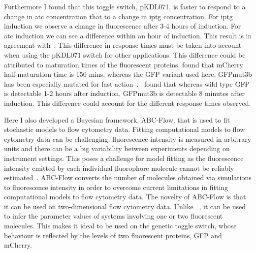 Furthermore I found that this toggle switch, pKDL071, is faster to respond to a change in \acrshort{atc} concentration that to a change in \acrshort{iptg} concentration. For \acrshort{iptg} induction we observe a change in fluorescence after 3-4 hours of induction. For \acrshort{atc} induction we can see a difference within an hour of induction. This result is in agreement with~\textcite{Litcofsky:2012gr}. This difference in response times must be taken into account when using the pKDL071 switch for other applications. This difference could be attributed to maturation times of the fluorescent proteins. \textcite{Macdonald:2012el} found that mCherry half-maturation time is 150 mins, whereas the GFP variant used here, GFPmut3b has been especially mutated for fast action~\autocite{Cormack:1996gv}.~\textcite{Cormack:1996gv} found that whereas wild type GFP is detectable 1-2 hours after induction, GFPmut3b is detectable 8 minutes after induction. This difference could account for the different response times observed.

Here I also developed a Bayesian framework, ABC-Flow, that is used to fit stochastic models to flow cytometry data. Fitting computational models to flow cytometry data can be challenging; fluorescence intensity is measured in arbitrary units and there can be a big variability between experiments depending on instrument settings. This poses a challenge for model fitting as the fluorescence intensity emitted by each individual fluorophore molecule cannot be reliably estimated~\autocite{Kelwick:2014iy}. ABC-Flow converts the number of molecules obtained via simulations to fluorescence intensity in order to overcome current limitations in fitting computational models to flow cytometry data. The novelty of ABC-Flow is that it can be used on two-dimensional flow cytometry data. Unlike ~\textcite{Lillacci:2013hu}, it can be used to infer the parameter values of systems involving one or two fluorescent molecules. This makes it ideal to be used on the genetic toggle switch, whose behaviour is reflected by the levels of two fluorescent proteins, GFP and mCherry.

